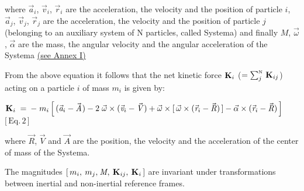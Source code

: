 \documentclass[10pt]{article}
\begin{document}
\par \bigskip \noindent where ${\vec{\mathit{a}}}_{i}$, ${\vec{\mathit{v}}}_{i}$, ${\vec{\mathit{r}}}_{i}$ are the acceleration, the velocity and the position of particle $i$, ${\vec{\mathit{a}}}_{j}$, ${\vec{\mathit{v}}}_{j}$, ${\vec{\mathit{r}}}_{j}$ are the acceleration, the velocity and the position of particle $j$ (\hspace{+0.15em}belonging to an auxiliary system of {\small N} particles, called Systema\hspace{+0.15em}) and finally ${\mathit{M}}$, ${\vec{\omega}}$, ${\vec{\alpha}}$ are the mass, the angular velocity and the angular acceleration of the Systema \hyperlink{a1p1}{(\hspace{+0.09em}see Annex I\hspace{+0.120em})}

\par \bigskip \noindent From the above equation it follows that the net kinetic force ${\mathbf{K}}_{\hspace{+0.009em}i}$ (\hspace{+0.237em}$ = \sum_{j}^{\scriptscriptstyle{\mathrm{N}}} \, {\mathbf{K}}_{\hspace{+0.009em}ij}$\hspace{+0.237em}) acting on a particle $i$ of mass $m_i$ is given by:

\par \bigskip \hypertarget{e1p2}{} ${\mathbf{K}}_{\hspace{+0.009em}i} \;=\: - \; m_i \, \Big[ \, ({\vec{\mathit{a}}}_{i} - {\vec{\mathit{A}}}\hspace{+0.06em}) - 2 \; {\vec{\omega}} \times ({\vec{\mathit{v}}}_{i} - {\vec{\mathit{V}}}) + {\vec{\omega}} \times [ \, {\vec{\omega}} \times ({\vec{\mathit{r}}}_{i} - {\vec{\mathit{R}}}) \, ] - {\vec{\alpha}} \times ({\vec{\mathit{r}}}_{i} - {\vec{\mathit{R}}}) \, \Big]$$\;\;$$\big[\,{\mathrm{Eq.\,2}}\,\big]$

\par \bigskip \noindent where ${\vec{\mathit{R}}}$, ${\vec{\mathit{V}}}$ and ${\vec{\mathit{A}}}$ are the position, the velocity and the acceleration of the center of mass of the Systema.

\par \bigskip \noindent The magnitudes $[ \, m_i, \: m_j,\hspace{+0.06em} {\mathit{M}}\hspace{-0.09em}, \: {\mathbf{K}}_{\hspace{+0.009em}ij}, \: {\mathbf{K}}_{\hspace{+0.009em}i} \, ]$ are invariant under transformations between inertial and non-inertial reference frames.
\end{document}

